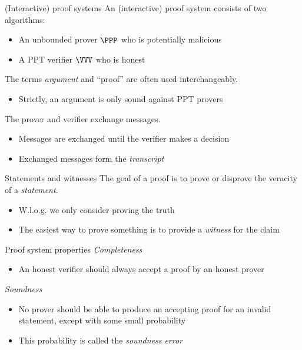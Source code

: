 \begin{frame}{(Interactive) proof systems}
  An (interactive) proof system consists of two algorithms:
  \begin{itemize}[<+(1)->]
    \item An unbounded prover $\PPP$ who is potentially malicious
    \item A PPT verifier $\VVV$ who is honest
  \end{itemize}

  \vspace*{1em}
  
  \pause
  The terms \emph{argument} and \enquote{proof} are often used interchangeably.
  \begin{itemize}[<+(1)->]
    \item Strictly, an argument is only sound against PPT provers
  \end{itemize}

  \vspace*{1em}

  \pause
  The prover and verifier exchange messages.
  \begin{itemize}[<+(1)->]
    \item Messages are exchanged until the verifier makes a decision
    \item Exchanged messages form the \emph{transcript}
  \end{itemize}
\end{frame}

\begin{frame}{Statements and witnesses}
  \pause
  The goal of a proof is to prove or disprove the veracity of a \emph{statement}.
  \begin{itemize}[<+(1)->]
    \item W.l.o.g. we only consider proving the truth
    \item The easiest way to prove something is to provide a \emph{witness} for the claim
  \end{itemize}
\end{frame}

\begin{frame}{Proof system properties}
  \pause
  \emph{Completeness}
  \begin{itemize}[<+(1)->]
    \item An honest verifier should always accept a proof by an honest prover
  \end{itemize}

  \vspace*{1em}

  \pause
  \emph{Soundness}
  \begin{itemize}[<+(1)->]
    \item No prover should be able to produce an accepting proof for an invalid statement, except with some small probability
    \item This probability is called the \emph{soundness error}
  \end{itemize}
\end{frame}

